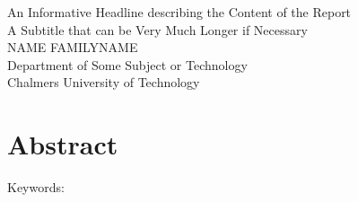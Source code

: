 An Informative Headline describing the Content of the Report\\
A Subtitle that can be Very Much Longer if Necessary\\
NAME FAMILYNAME\\
Department of Some Subject or Technology\\
Chalmers University of Technology \setlength{\parskip}{0.5cm}

\thispagestyle{plain}			%
\setlength{\parskip}{0pt plus 1.0pt}
\section*{Abstract}
 

\vfill
Keywords: 

\newpage				%
\thispagestyle{empty}
\mbox{}